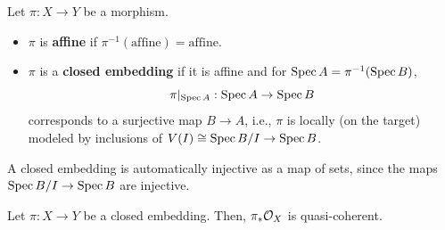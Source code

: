 \documentclass[12pt]{article}
\begin{document}
\begin{defn}
    Let $\pi: X\to Y$ be a morphism.
    \begin{itemize}
        \item $\pi$ is \textbf{affine} if $\pi^{-1}(\text{affine}) = \text{affine}$.
        \item $\pi$ is a \textbf{closed embedding} if it is affine and for $\operatorname{Spec} A=\pi^{-1}(\operatorname{Spec} B)$,
        \[\pi|_{\operatorname{Spec} A}: \operatorname{Spec} A \to \operatorname{Spec} B\]
        corresponds to a surjective map $B\to A$, i.e., $\pi$ is locally (on the target) modeled by inclusions of $V(I) \cong \operatorname{Spec} B/I \to \operatorname{Spec} B$.
    \end{itemize}
\end{defn}

\begin{rmk}
    A closed embedding is automatically injective as a map of sets, since the maps $\operatorname{Spec} B/I \to \operatorname{Spec} B$ are injective.
\end{rmk}

\begin{prop}
    Let $\pi: X\to Y$ be a closed embedding. Then, $\pi_* \mathcal{O}_X$ is quasi-coherent.
\end{prop}
\end{document}
